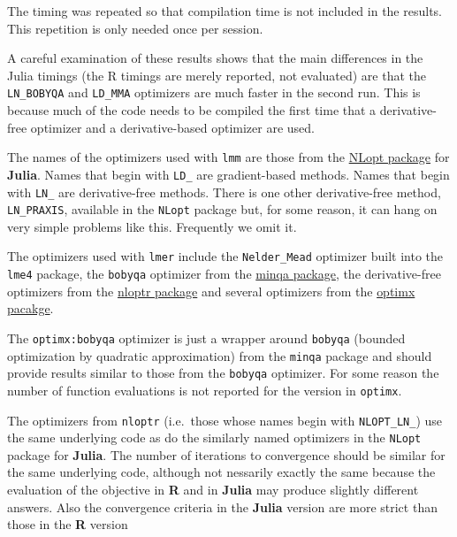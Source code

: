 \documentclass{article}
\begin{document}
    The timing was repeated so that compilation time is not included in the
results. This repetition is only needed once per session.

A careful examination of these results shows that the main differences
in the Julia timings (the R timings are merely reported, not evaluated)
are that the \texttt{LN\_BOBYQA} and \texttt{LD\_MMA} optimizers are
much faster in the second run. This is because much of the code needs to
be compiled the first time that a derivative-free optimizer and a
derivative-based optimizer are used.

The names of the optimizers used with \texttt{lmm} are those from the
\href{https://github.com/JuliaOpt/NLopt.jl}{NLopt package} for
\textbf{Julia}. Names that begin with \texttt{LD\_} are gradient-based
methods. Names that begin with \texttt{LN\_} are derivative-free
methods. There is one other derivative-free method, \texttt{LN\_PRAXIS},
available in the \texttt{NLopt} package but, for some reason, it can
hang on very simple problems like this. Frequently we omit it.

The optimizers used with \texttt{lmer} include the \texttt{Nelder\_Mead}
optimizer built into the \texttt{lme4} package, the \texttt{bobyqa}
optimizer from the
\href{http://cran.rstudio.com/web/packages/minqa/index.html}{minqa
package}, the derivative-free optimizers from the
\href{http://cran.rstudio.com/web/packages/nloptr/index.html}{nloptr
package} and several optimizers from the
\href{http://cran.rstudio.com/web/packages/optimx/index.html}{optimx
pacakge}.

The \texttt{optimx:bobyqa} optimizer is just a wrapper around
\texttt{bobyqa} (bounded optimization by quadratic approximation) from
the \texttt{minqa} package and should provide results similar to those
from the \texttt{bobyqa} optimizer. For some reason the number of
function evaluations is not reported for the version in \texttt{optimx}.

The optimizers from \texttt{nloptr} (i.e.~those whose names begin with
\texttt{NLOPT\_LN\_}) use the same underlying code as do the similarly
named optimizers in the \texttt{NLopt} package for \textbf{Julia}. The
number of iterations to convergence should be similar for the same
underlying code, although not nessarily exactly the same because the
evaluation of the objective in \textbf{R} and in \textbf{Julia} may
produce slightly different answers. Also the convergence criteria in the
\textbf{Julia} version are more strict than those in the \textbf{R}
version
\end{document}
